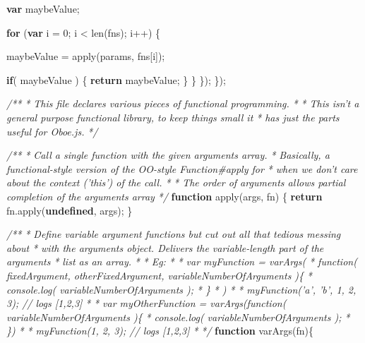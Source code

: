 \documentclass[12pt, ]{article}
\newenvironment{Shaded}{}{}
\newcommand{\KeywordTok}[1]{\textcolor[rgb]{0.00,0.44,0.13}{\textbf{{#1}}}}
\newcommand{\DecValTok}[1]{\textcolor[rgb]{0.25,0.63,0.44}{{#1}}}
\newcommand{\CommentTok}[1]{\textcolor[rgb]{0.38,0.63,0.69}{\textit{{#1}}}}
\newcommand{\OtherTok}[1]{\textcolor[rgb]{0.00,0.44,0.13}{{#1}}}
\newcommand{\FunctionTok}[1]{\textcolor[rgb]{0.02,0.16,0.49}{{#1}}}
\newcommand{\NormalTok}[1]{{#1}}
\begin{document}
\begin{Shaded}
\begin{Highlighting}[]
         \KeywordTok{var} \NormalTok{maybeValue;}
   
         \KeywordTok{for} \NormalTok{(}\KeywordTok{var} \NormalTok{i = }\DecValTok{0}\NormalTok{; i < }\FunctionTok{len}\NormalTok{(fns); i++) \{}
   
            \NormalTok{maybeValue = }\FunctionTok{apply}\NormalTok{(params, fns[i]);}
   
            \KeywordTok{if}\NormalTok{( maybeValue ) \{}
               \KeywordTok{return} \NormalTok{maybeValue;}
            \NormalTok{\}}
         \NormalTok{\}}
      \NormalTok{\});}
   \NormalTok{\});   }

\CommentTok{/**}
\CommentTok{ * This file declares various pieces of functional programming.}
\CommentTok{ * }
\CommentTok{ * This isn't a general purpose functional library, to keep things small it}
\CommentTok{ * has just the parts useful for Oboe.js.}
\CommentTok{ */}


\CommentTok{/**}
\CommentTok{ * Call a single function with the given arguments array.}
\CommentTok{ * Basically, a functional-style version of the OO-style Function#apply for }
\CommentTok{ * when we don't care about the context ('this') of the call.}
\CommentTok{ * }
\CommentTok{ * The order of arguments allows partial completion of the arguments array}
\CommentTok{ */}
\KeywordTok{function} \FunctionTok{apply}\NormalTok{(args, fn) \{}
   \KeywordTok{return} \OtherTok{fn}\NormalTok{.}\FunctionTok{apply}\NormalTok{(}\KeywordTok{undefined}\NormalTok{, args);}
\NormalTok{\}}

\CommentTok{/**}
\CommentTok{ * Define variable argument functions but cut out all that tedious messing about }
\CommentTok{ * with the arguments object. Delivers the variable-length part of the arguments}
\CommentTok{ * list as an array.}
\CommentTok{ * }
\CommentTok{ * Eg:}
\CommentTok{ * }
\CommentTok{ * var myFunction = varArgs(}
\CommentTok{ *    function( fixedArgument, otherFixedArgument, variableNumberOfArguments )\{}
\CommentTok{ *       console.log( variableNumberOfArguments );}
\CommentTok{ *    \}}
\CommentTok{ * )}
\CommentTok{ * }
\CommentTok{ * myFunction('a', 'b', 1, 2, 3); // logs [1,2,3]}
\CommentTok{ * }
\CommentTok{ * var myOtherFunction = varArgs(function( variableNumberOfArguments )\{}
\CommentTok{ *    console.log( variableNumberOfArguments );}
\CommentTok{ * \})}
\CommentTok{ * }
\CommentTok{ * myFunction(1, 2, 3); // logs [1,2,3]}
\CommentTok{ * }
\CommentTok{ */}
\KeywordTok{function} \FunctionTok{varArgs}\NormalTok{(fn)\{}


\end{Highlighting}
\end{Shaded}
\end{document}
